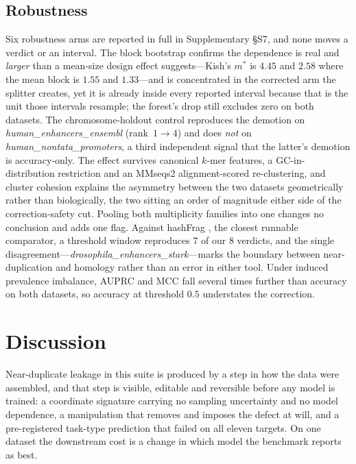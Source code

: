 \documentclass[webpdf,modern,large,namedate]{oup-authoring-template}%
\begin{document}
\subsection{Robustness}\label{sec:r-robust}
Six robustness arms are reported in full in Supplementary \S S7, and none moves a verdict or an
interval. The block bootstrap confirms the dependence is real and \emph{larger} than a mean-size
design effect suggests---Kish's $m^{*}$ is $4.45$ and $2.58$ where the mean block is $1.55$ and
$1.33$---and is concentrated in the corrected arm the splitter creates, yet it is already inside
every reported interval because that is the unit those intervals resample; the forest's drop still
excludes zero on both datasets. The chromosome-holdout control reproduces the demotion on
\textit{human\_enhancers\_ensembl} (rank~$1\to4$) and does \emph{not} on
\textit{human\_nontata\_promoters}, a third independent signal that the latter's demotion is
accuracy-only. The effect survives canonical $k$-mer features, a GC-in-distribution restriction and
an MMseqs2 alignment-scored re-clustering, and cluster cohesion explains the asymmetry between the
two datasets geometrically rather than biologically, the two sitting an order of magnitude either
side of the correction-safety cut. Pooling both
multiplicity families into one changes no conclusion and adds one flag. Against hashFrag
\citep{rafi2026}, the closest runnable comparator, a threshold window reproduces $7$ of our $8$
verdicts, and the single disagreement---\textit{drosophila\_enhancers\_stark}---marks the boundary
between near-duplication and homology rather than an error in either tool. Under induced prevalence
imbalance, AUPRC and MCC fall several times further than accuracy on both datasets, so accuracy at
threshold $0.5$ understates the correction.

\section{Discussion}\label{sec:discussion}

Near-duplicate leakage in this suite is produced by a step in how the data were assembled, and that step is visible, editable and reversible before any model is trained: a coordinate signature carrying no sampling uncertainty and no model dependence, a manipulation that removes and imposes the defect at will, and a pre-registered task-type prediction that failed on all eleven targets. On one dataset the downstream cost is a change in which model the benchmark reports as best.
\end{document}
